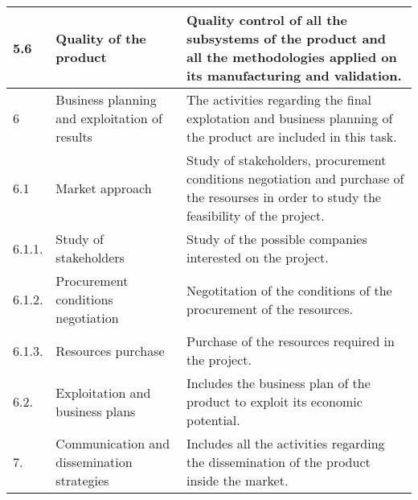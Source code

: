 \begin{longtable}[H]{l >{\raggedright\arraybackslash}p{4cm} p{8cm}}
	\midrule
	
	5.6 & Quality of the product & Quality control of all the subsystems of the product and all the methodologies applied on its manufacturing and validation.\vspace{0.2cm} \\
	
	\midrule
	
	6 & Business planning and exploitation of results & The activities regarding the final explotation and business planning of the product are included in this task.\vspace{0.2cm} \\
	
	\midrule
	
	6.1 & Market approach & Study of stakeholders, procurement conditions negotiation and purchase of the resourses in order to study the feasibility of the project.\vspace{0.2cm} \\
	
	\midrule
	
	6.1.1. & Study of stakeholders & Study of the possible companies interested on the project.\vspace{0.2cm} \\
	
	\midrule
	
	6.1.2. & Procurement conditions negotiation & Negotitation of the conditions of the procurement of the resources.\vspace{0.2cm} \\
	
	\midrule
	
	6.1.3. & Resources purchase & Purchase of the resources required in the project.\vspace{0.2cm} \\
	
	\midrule
	
	6.2. & Exploitation and business plans & Includes the business plan of the product to exploit its economic potential.\vspace{0.2cm} \\
	
	\midrule
	
	7. & Communication and dissemination strategies & Includes all the activities regarding the dissemination of the product inside the market.\vspace{0.2cm} \\
	
	\midrule
	

\end{longtable}
